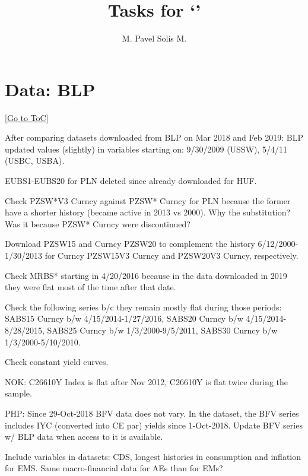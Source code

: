 \documentclass[12pt]{article}
\newcommand{\gototoc}{\vspace{-1.8cm} \null\hfill [\hyperlink{toc}{Go to ToC}] \newline}
\begin{document}
	\title{Tasks for `'}
	\author{M. Pavel Solís M.}
	\date{}
	\maketitle
	\hypertarget{toc}{}								 %
	\tableofcontents
	\vspace{2.5\bigskipamount}
	

\section{Data: BLP}
\gototoc
\begin{todolist}
	\item After comparing datasets downloaded from BLP on Mar 2018 and Feb 2019: BLP updated values (slightly) in variables starting on: 9/30/2009 (USSW), 5/4/11 (USBC, USBA).
	\item EUBS1-EUBS20 for PLN deleted since already downloaded for HUF.
	\item Check PZSW*V3 Curncy against PZSW* Curncy for PLN because the former have a shorter history (became active in 2013 vs 2000). Why the substitution? Was it because PZSW* Curncy were discontinued?
	\item Download PZSW15 and Curncy PZSW20 to complement the history 6/12/2000-1/30/2013 for Curncy PZSW15V3 Curncy and PZSW20V3 Curncy, respectively.
	\item Check MRBS* starting in 4/20/2016 because in the data downloaded in 2019 they were flat most of the time after that date.
	\item Check the following series b/c they remain mostly flat during those periods: SABS15 Curncy b/w 4/15/2014-1/27/2016, SABS20 Curncy b/w 4/15/2014-8/28/2015, SABS25 Curncy b/w 1/3/2000-9/5/2011, SABS30 Curncy b/w 1/3/2000-5/10/2010.
	\item Check constant yield curves.
	\begin{todolist}
		\item NOK: C26610Y Index is flat after Nov 2012, C26610Y is flat twice during the sample.
		\item PHP: Since 29-Oct-2018 BFV data does not vary. In the dataset, the BFV series includes IYC (converted into CE par) yields since 1-Oct-2018. Update BFV series w/ BLP data when access to it is available.
	\end{todolist}
	\item Include variables in datasets: CDS, longest histories in consumption and inflation for EMS. Same macro-financial data for AEs than for EMs?
\end{todolist}
\end{document}
